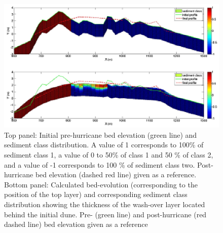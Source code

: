 \begin{figure}[h]
  \centering
  \includegraphics[width=\textwidth]{image46}
  \caption{Top panel: Initial pre-hurricane bed elevation (green line) and sediment class distribution. A value of 1 corresponds to 100\% of sediment class 1, a value of 0 to 50\% of class 1 and 50 \% of class 2, and a value of -1 corresponds to 100 \% of sediment class two. Post-hurricane bed elevation (dashed red line) given as a reference. Bottom panel: Calculated bed-evolution (corresponding to the position of the top layer) and corresponding sediment class distribution showing the thickness of the wash-over layer located behind the initial dune. Pre- (green line) and post-hurricane (red dashed line) bed elevation given as a reference}
  \label{fig:image46}
\end{figure}

